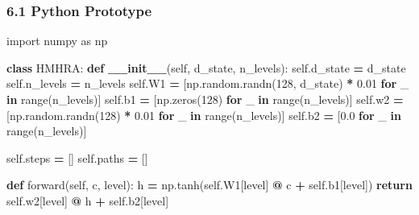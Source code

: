 \documentclass[
  11pt,
  a4paper,
]{article}
\newenvironment{Shaded}{\begin{snugshade}}{\end{snugshade}}
\newcommand{\BuiltInTok}[1]{#1}
\newcommand{\ControlFlowTok}[1]{\textcolor[rgb]{0.13,0.29,0.53}{\textbf{#1}}}
\newcommand{\DecValTok}[1]{\textcolor[rgb]{0.00,0.00,0.81}{#1}}
\newcommand{\FloatTok}[1]{\textcolor[rgb]{0.00,0.00,0.81}{#1}}
\newcommand{\FunctionTok}[1]{\textcolor[rgb]{0.13,0.29,0.53}{\textbf{#1}}}
\newcommand{\ImportTok}[1]{#1}
\newcommand{\KeywordTok}[1]{\textcolor[rgb]{0.13,0.29,0.53}{\textbf{#1}}}
\newcommand{\NormalTok}[1]{#1}
\newcommand{\OperatorTok}[1]{\textcolor[rgb]{0.81,0.36,0.00}{\textbf{#1}}}
\newcommand{\VariableTok}[1]{\textcolor[rgb]{0.00,0.00,0.00}{#1}}
\begin{document}
\subsubsection{6.1 Python Prototype}\label{python-prototype}

\begin{Shaded}
\begin{Highlighting}[]
\ImportTok{import}\NormalTok{ numpy }\ImportTok{as}\NormalTok{ np}

\KeywordTok{class}\NormalTok{ HMHRA:}
    \KeywordTok{def} \FunctionTok{\_\_init\_\_}\NormalTok{(}\VariableTok{self}\NormalTok{, d\_state, n\_levels):}
        \VariableTok{self}\NormalTok{.d\_state }\OperatorTok{=}\NormalTok{ d\_state}
        \VariableTok{self}\NormalTok{.n\_levels }\OperatorTok{=}\NormalTok{ n\_levels}
        \VariableTok{self}\NormalTok{.W1 }\OperatorTok{=}\NormalTok{ [np.random.randn(}\DecValTok{128}\NormalTok{, d\_state) }\OperatorTok{*} \FloatTok{0.01} \ControlFlowTok{for}\NormalTok{ \_ }\KeywordTok{in} \BuiltInTok{range}\NormalTok{(n\_levels)]}
        \VariableTok{self}\NormalTok{.b1 }\OperatorTok{=}\NormalTok{ [np.zeros(}\DecValTok{128}\NormalTok{) }\ControlFlowTok{for}\NormalTok{ \_ }\KeywordTok{in} \BuiltInTok{range}\NormalTok{(n\_levels)]}
        \VariableTok{self}\NormalTok{.w2 }\OperatorTok{=}\NormalTok{ [np.random.randn(}\DecValTok{128}\NormalTok{) }\OperatorTok{*} \FloatTok{0.01} \ControlFlowTok{for}\NormalTok{ \_ }\KeywordTok{in} \BuiltInTok{range}\NormalTok{(n\_levels)]}
        \VariableTok{self}\NormalTok{.b2 }\OperatorTok{=}\NormalTok{ [}\FloatTok{0.0} \ControlFlowTok{for}\NormalTok{ \_ }\KeywordTok{in} \BuiltInTok{range}\NormalTok{(n\_levels)]}
        
        \VariableTok{self}\NormalTok{.steps }\OperatorTok{=}\NormalTok{ []}
        \VariableTok{self}\NormalTok{.paths }\OperatorTok{=}\NormalTok{ []}
    
    \KeywordTok{def}\NormalTok{ forward(}\VariableTok{self}\NormalTok{, c, level):}
\NormalTok{        h }\OperatorTok{=}\NormalTok{ np.tanh(}\VariableTok{self}\NormalTok{.W1[level] }\OperatorTok{@}\NormalTok{ c }\OperatorTok{+} \VariableTok{self}\NormalTok{.b1[level])}
        \ControlFlowTok{return} \VariableTok{self}\NormalTok{.w2[level] }\OperatorTok{@}\NormalTok{ h }\OperatorTok{+} \VariableTok{self}\NormalTok{.b2[level]}
    

\end{Highlighting}
\end{Shaded}
\end{document}
